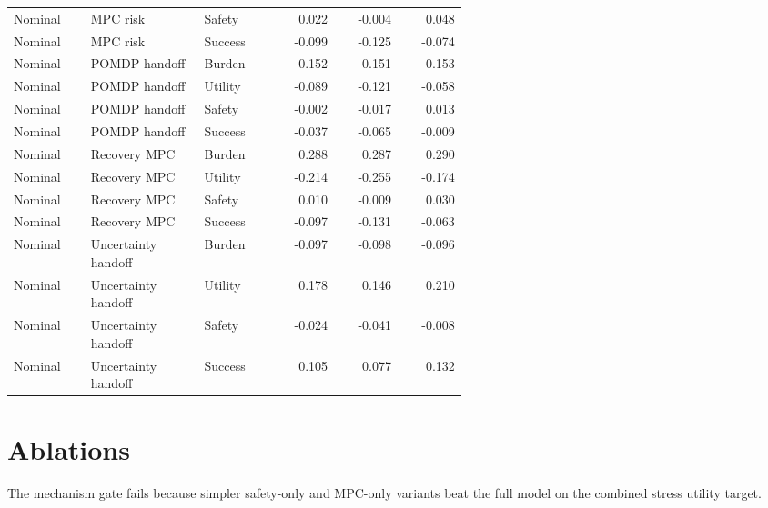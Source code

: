 \documentclass{article}
\begin{document}
\begin{center}
\begin{longtable}{p{0.17\linewidth}p{0.25\linewidth}p{0.16\linewidth}rrr}
Nominal & MPC risk & Safety & 0.022 & -0.004 & 0.048\\
Nominal & MPC risk & Success & -0.099 & -0.125 & -0.074\\
Nominal & POMDP handoff & Burden & 0.152 & 0.151 & 0.153\\
Nominal & POMDP handoff & Utility & -0.089 & -0.121 & -0.058\\
Nominal & POMDP handoff & Safety & -0.002 & -0.017 & 0.013\\
Nominal & POMDP handoff & Success & -0.037 & -0.065 & -0.009\\
Nominal & Recovery MPC & Burden & 0.288 & 0.287 & 0.290\\
Nominal & Recovery MPC & Utility & -0.214 & -0.255 & -0.174\\
Nominal & Recovery MPC & Safety & 0.010 & -0.009 & 0.030\\
Nominal & Recovery MPC & Success & -0.097 & -0.131 & -0.063\\
Nominal & Uncertainty handoff & Burden & -0.097 & -0.098 & -0.096\\
Nominal & Uncertainty handoff & Utility & 0.178 & 0.146 & 0.210\\
Nominal & Uncertainty handoff & Safety & -0.024 & -0.041 & -0.008\\
Nominal & Uncertainty handoff & Success & 0.105 & 0.077 & 0.132\\
\bottomrule
\end{longtable}
\normalsize
\end{center}

\section{Ablations}

The mechanism gate fails because simpler safety-only and MPC-only variants beat the full model on the combined stress utility target.
\end{document}
